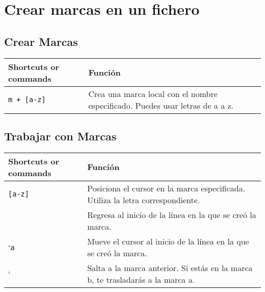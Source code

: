 \documentclass[
  doc,
  floatsintext,
  longtable,
  a4paper,
  nolmodern,
  notxfonts,
  notimes,
  colorlinks=true,linkcolor=blue,citecolor=blue,urlcolor=blue]{apa7}
\begin{document}
\section{Crear marcas en un fichero}\label{crear-marcas-en-un-fichero}

\subsection{Crear Marcas}\label{crear-marcas}

\begin{longtable}[]{@{}
  >{\raggedright\arraybackslash}p{}
  >{\raggedright\arraybackslash}p{}@{}}
\toprule\noalign{}
\begin{minipage}[b]{\linewidth}\raggedright
Shortcuts or commands
\end{minipage} & \begin{minipage}[b]{\linewidth}\raggedright
Función
\end{minipage} \\
\midrule\noalign{}
\endhead
\bottomrule\noalign{}
\endlastfoot
\texttt{m\ +\ {[}a-z{]}} & Crea una marca local con el nombre
especificado. Puedes usar letras de a a z. \\
\end{longtable}

\subsection{Trabajar con Marcas}\label{trabajar-con-marcas}

\begin{longtable}[]{@{}
  >{\raggedright\arraybackslash}p{}
  >{\raggedright\arraybackslash}p{}@{}}
\toprule\noalign{}
\begin{minipage}[b]{\linewidth}\raggedright
Shortcuts or commands
\end{minipage} & \begin{minipage}[b]{\linewidth}\raggedright
Función
\end{minipage} \\
\midrule\noalign{}
\endhead
\bottomrule\noalign{}
\endlastfoot
\texttt{{[}a-z{]}} & Posiciona el cursor en la marca especificada.
Utiliza la letra correspondiente. \\
\texttt{\textquotesingle{}} & Regresa al inicio de la línea en la que se
creó la marca. \\
`\texttt{a} & Mueve el cursor al inicio de la línea en la que se creó la
marca. \\
` & Salta a la marca anterior. Si estás en la marca b, te trasladarás a
la marca a. \\
\end{longtable}
\end{document}
